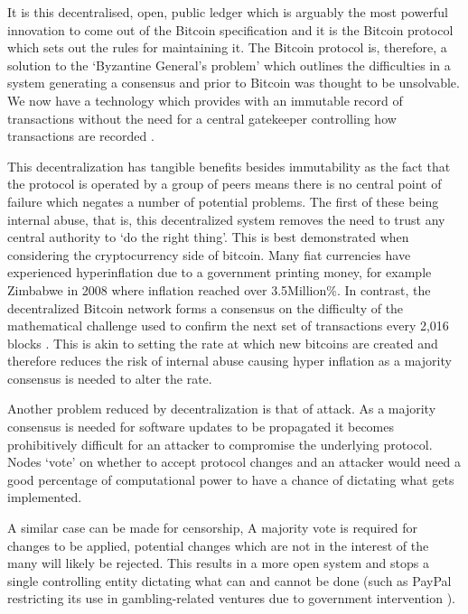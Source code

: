 \documentclass{article}
\begin{document}
It is this decentralised, open, public ledger which is arguably the most powerful innovation to come out of the Bitcoin specification and it is the Bitcoin protocol which sets out the rules for maintaining it. The Bitcoin protocol is, therefore, a solution to the `Byzantine General's problem’ \citep{18_lamport_shostak_pease_1982} which outlines the difficulties in a system generating a consensus and prior to Bitcoin was thought to be unsolvable. We now have a technology which provides with an immutable record of transactions without the need for a central gatekeeper controlling how transactions are recorded \citep{19_campbell_2015}.

This decentralization has tangible benefits besides immutability as the fact that the protocol is operated by a group of peers means there is no central point of failure which negates a number of potential problems. The first of these being internal abuse, that is, this decentralized system removes the need to trust any central authority to `do the right thing'. This is best demonstrated when considering the cryptocurrency side of bitcoin. Many fiat currencies have experienced hyperinflation due to a government printing money, for example Zimbabwe in 2008 \citep{21_zimbabwe_phases_out_local_currency_at_35_quadrillion_to_us_2015} where inflation reached over 3.5Million\%. In contrast, the decentralized Bitcoin network forms a consensus on the difficulty of the mathematical challenge used to confirm the next set of transactions every 2,016 blocks \citep{20_developer_guide_bitcoin_2016}. This is akin to setting the rate at which new bitcoins are created and therefore reduces the risk of internal abuse causing hyper inflation as a majority consensus is needed to alter the rate.

Another problem reduced by decentralization is that of attack. As a majority consensus is needed for software updates to be propagated \citep{21_zimbabwe_phases_out_local_currency_at_35_quadrillion_to_us_2015}\citep{22_brave_new_coin_2016} it becomes prohibitively difficult for an attacker to compromise the underlying protocol. Nodes `vote' on whether to accept protocol changes and an attacker would need a good percentage of computational power to have a chance of dictating what gets implemented.

A similar case can be made for censorship, A majority vote is required for changes to be applied, potential changes which are not in the interest of the many will likely be rejected. This results in a more open system and stops a single controlling entity dictating what can and cannot be done (such as PayPal restricting its use in gambling-related ventures due to government intervention \citep{23_customer_support_2016}).
\end{document}
